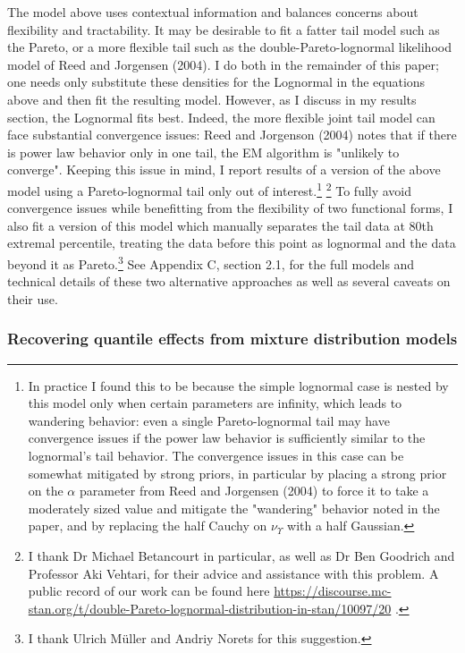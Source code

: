 \documentclass[english,12pt]{article}\usepackage{lmodern}
\numberwithin{equation}{section}
\begin{document}
The model above uses contextual information and balances concerns about flexibility and tractability. It may be desirable to fit a fatter tail model such as the Pareto, or a more flexible tail such as the double-Pareto-lognormal likelihood model of Reed and Jorgensen (2004). I do both in the remainder of this paper; one needs only substitute these densities for the Lognormal in the equations above and then fit the resulting model. However, as I discuss in my results section, the Lognormal fits best. Indeed, the more flexible joint tail model can face substantial convergence issues: Reed and Jorgenson (2004) notes that if there is power law behavior only in one tail, the EM algorithm is "unlikely to converge". Keeping this issue in mind, I report results of a version of the above model using a Pareto-lognormal tail only out of interest.\footnote{In practice I found this to be because the simple lognormal case is nested by this model only when certain parameters are infinity, which leads to wandering behavior: even a single Pareto-lognormal tail may have convergence issues if the power law behavior is sufficiently similar to the lognormal's tail behavior. The convergence issues in this case can be somewhat mitigated by strong priors, in particular by placing a strong prior on the $\alpha$ parameter from Reed and Jorgensen (2004) to force it to take a moderately sized value and mitigate the "wandering" behavior noted in the paper, and by replacing the half Cauchy on $\nu_{\Upsilon}$ with a half Gaussian.} \footnote{I thank Dr Michael Betancourt in particular, as well as Dr Ben Goodrich and Professor Aki Vehtari, for their advice and assistance with this problem. A public record of our work can be found here \url{https://discourse.mc-stan.org/t/double-Pareto-lognormal-distribution-in-stan/10097/20} .} To fully avoid convergence issues while benefitting from the flexibility of two functional forms, I also fit a version of this model which manually separates the tail data at 80th extremal percentile, treating the data before this point as lognormal and the data beyond it as Pareto.\footnote{I thank Ulrich M{\"u}ller and Andriy Norets for this suggestion.}  See Appendix C, section 2.1, for the full models and technical details of these two alternative approaches as well as several caveats on their use. 

\subsubsection{Recovering quantile effects from mixture distribution models}
\end{document}

